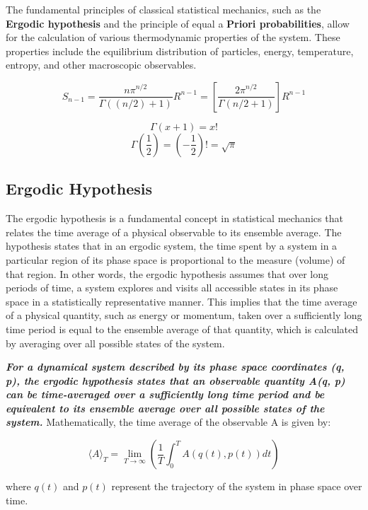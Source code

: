 \documentclass{article}
\begin{document}
The fundamental principles of classical statistical mechanics, such as the \textbf{Ergodic hypothesis} and the principle of equal a \textbf{Priori probabilities}, allow for the calculation of various thermodynamic properties of the system. These properties include the equilibrium distribution of particles, energy, temperature, entropy, and other macroscopic observables.

$$S_{n-1} = \frac{{n\pi^{n/2}}}{{\Gamma((n/2)+1)}} R^{n-1}=\left[\frac{{2\pi^{n/2}}}{{\Gamma(n/2+1)}}\right] R^{n-1} $$

$$\Gamma(x + 1) = x!$$
$$\Gamma\left(\frac{1}{2}\right) = \left(-\frac{1}{2}\right)! = \sqrt{\pi}$$


\subsection{Ergodic Hypothesis}
The ergodic hypothesis is a fundamental concept in statistical mechanics that relates the time average of a physical observable to its ensemble average. The hypothesis states that in an ergodic system, the time spent by a system in a particular region of its phase space is proportional to the measure (volume) of that region.
In other words, the ergodic hypothesis assumes that over long periods of time, a system explores and visits all accessible states in its phase space in a statistically representative manner. This implies that the time average of a physical quantity, such as energy or momentum, taken over a sufficiently long time period is equal to the ensemble average of that quantity, which is calculated by averaging over all possible states of the system.

\textbf{\textit{For a dynamical system described by its phase space coordinates (q, p), the ergodic hypothesis states that an observable quantity A(q, p) can be time-averaged over a sufficiently long time period and be equivalent to its ensemble average over all possible states of the system.}}
Mathematically, the time average of the observable A is given by:

$$\langle A \rangle_T = \lim_{{T\to\infty}} \left(\frac{1}{T} \int_0^T A(q(t), p(t)) dt\right)$$

where $q(t)$ and $p(t)$ represent the trajectory of the system in phase space over time.
\end{document}
